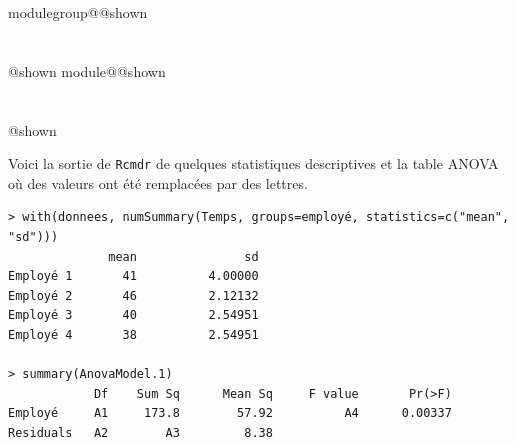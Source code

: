 \documentclass{Evaluation}
\makeatletter
\newcommand{\currentmodulekey}{}
\newcommand{\currentmoduletitle}{}
\newcommand{\currentgroupkey}{}
\newcommand{\currentgrouptitle}{}
\newcommand{\showmoduleifneeded}{%
  \ifx\currentgroupkey\empty\else
    \expandafter\ifx\csname modulegroup@\currentgroupkey @shown\endcsname\relax
      \section*{\currentgrouptitle}%
      \expandafter\gdef\csname modulegroup@\currentgroupkey @shown\endcsname{1}%
    \fi
  \fi
  \expandafter\ifx\csname module@\currentmodulekey @shown\endcsname\relax
    \section*{\currentmoduletitle}%
    \expandafter\gdef\csname module@\currentmodulekey @shown\endcsname{1}%
  \fi
}
\newenvironment{A22}{\showmoduleifneeded}{}
\makeatother
\begin{document}
\begin{questions}
\begin{A22}
Voici la sortie de \texttt{Rcmdr} de quelques statistiques descriptives et la table ANOVA où des valeurs ont été remplacées par des lettres.

\begin{verbatim} 
> with(donnees, numSummary(Temps, groups=employé, statistics=c("mean", "sd")))
              mean               sd
Employé 1       41          4.00000
Employé 2       46          2.12132
Employé 3       40          2.54951
Employé 4       38          2.54951

> summary(AnovaModel.1)
            Df    Sum Sq      Mean Sq     F value       Pr(>F)
Employé     A1     173.8        57.92          A4      0.00337
Residuals   A2        A3         8.38
\end{verbatim}

\end{A22}
\end{questions}
\end{document}
